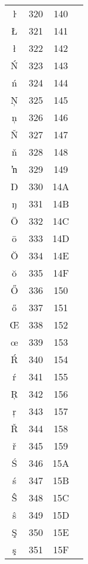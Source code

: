 \documentclass[10pt]{article}
\begin{document}
\begin{tabular}{crcl}
ŀ&320&140&\\
Ł&321&141&\\
ł&322&142&\\
Ń&323&143&\\
ń&324&144&\\
Ņ&325&145&\\
ņ&326&146&\\
Ň&327&147&\\
ň&328&148&\\
ŉ&329&149&\\
Ŋ&330&14A&\\
ŋ&331&14B&\\
Ō&332&14C&\\
ō&333&14D&\\
Ŏ&334&14E&\\
ŏ&335&14F&\\
Ő&336&150&\\
ő&337&151&\\
Œ&338&152&\\
œ&339&153&\\
Ŕ&340&154&\\
ŕ&341&155&\\
Ŗ&342&156&\\
ŗ&343&157&\\
Ř&344&158&\\
ř&345&159&\\
Ś&346&15A&\\
ś&347&15B&\\
Ŝ&348&15C&\\
ŝ&349&15D&\\
Ş&350&15E&\\
ş&351&15F&\\
\end{tabular}
\end{document}
